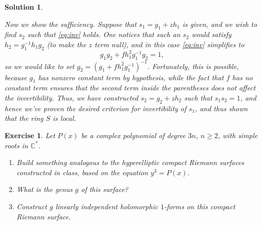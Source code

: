 \documentclass{article}
\newtheorem{ex}{Exercise}
\theoremstyle{nonumberplain}
\newtheorem{sol}{Solution}
\newcommand{\C}{\mathbb{C}}
\begin{document}
\begin{sol}
\begin{enumerate}
Now we show the sufficiency. Suppose that $s_1 = g_1 + z h_1$ is given, and we wish to find $s_2$ such that \eqref{eq:inv} holds. One notices that such an $s_2$ would satisfy $h_2 = g_1^{-1} h_1 g_2$ (to make the $z$ term null), and in this case \eqref{eq:inv} simplifies to
\begin{equation}
g_1 g_2 + f h_1^2 g_1^{-1} g_2 = 1,
\end{equation}
so we would like to set $g_2 = (g_1 + f h_1^2 g_1^{-1})^{-1}$. Fortunately, this is possible, because $g_1$ has nonzero constant term by hypothesis, while the fact that $f$ has no constant term ensures that the second term inside the parentheses does not affect the invertibility. Thus, we have constructed $s_2 = g_2 + z h_2$ such that $s_1 s_2 = 1$, and hence we've proven the desired criterion for invertibility of $s_1$, and thus shown that the ring $S$ is local.
\end{enumerate}
\end{sol}

\begin{ex} Let $P(x)$ be a complex polynomial of degree $3n$, $n \geq 2$, with simple roots in $\C^*$.
\begin{enumerate}
\item Build something analogous to the hyperelliptic compact Riemann surfaces constructed in class, based on the equation $y^3 = P(x)$.
\item What is the genus $g$ of this surface?
\item Construct $g$ linearly independent holomorphic $1$-forms on this compact Riemann surface.
\end{enumerate}
\end{ex}
\end{document}

